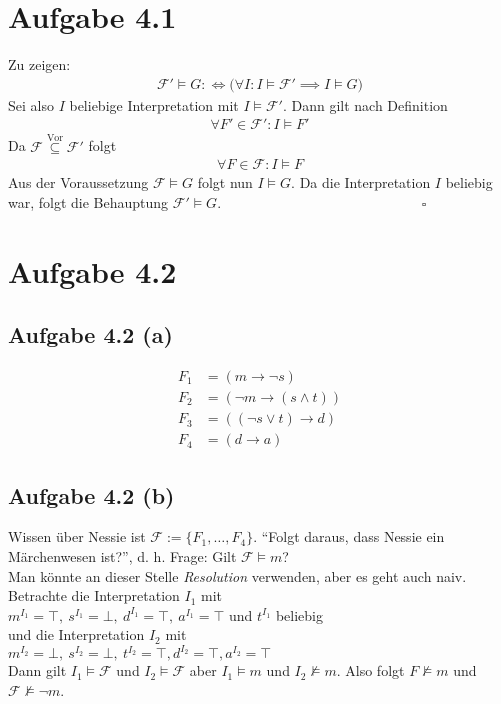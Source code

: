 \documentclass[12pt,a4paper]{article}
\author{Willi Sontopski}
\newcommand{\F}{\mathcal{F}}
\begin{document}

\section*{Aufgabe 4.1}
Zu zeigen:
\begin{align*}
\F'\models G:\Longleftrightarrow\big(\forall I:I\models\F'\implies I\models G\big)
\end{align*}
Sei also $I$ beliebige Interpretation mit $I\models\F'$. Dann gilt nach Definition
\begin{align*}
\forall F'\in\F':I\models F'
\end{align*}
Da $\F\stackrel{\text{Vor}}{\subseteq}\F'$ folgt 
\begin{align*}
\forall F\in\F:I\models F
\end{align*}
Aus der Voraussetzung $\F\models G$ folgt nun $I\models G$. Da die Interpretation $I$ beliebig war, folgt die Behauptung $\F'\models G$. $\qquad\qquad\qquad\qquad\qquad\qquad\qquad\square$

\section*{Aufgabe 4.2}
\subsection*{Aufgabe 4.2 (a)}
\begin{align*}
F_1 &=(m \to\neg s)\\
F_2 &=(\neg m\to (s\wedge t))\\
F_3&=((\neg s\vee t)\to d)\\
F_4&=(d\to a)
\end{align*}

\subsection*{Aufgabe 4.2 (b)}
Wissen über Nessie ist $\F:=\lbrace F_1,\ldots, F_4\rbrace$.
``Folgt daraus, dass Nessie ein Märchenwesen ist?'', d. h.
Frage: Gilt $\F\models m$?\\

Man könnte an dieser Stelle \textit{Resolution} verwenden, aber es geht auch naiv. Betrachte die Interpretation $I_1$ mit\\
$m^{I_1}=\top,~s^{I_1}=\bot,~d^{I_1}=\top,~a^{I_1}=\top$ und $t^{I_1}$ beliebig\\ und die Interpretation $I_2$ mit\\
$m^{I_2}=\bot,~s^{I_2}=\bot,~t^{I_2}=\top, d^{I_2}=\top,a^{I_2}=\top$\\
Dann gilt $I_1\models\F$ und $I_2\models\F$ aber $I_1\models m$ und $I_2\not\models m$. Also folgt $F\not\models m$ und $\F\not\models\neg m$.
\end{document}
